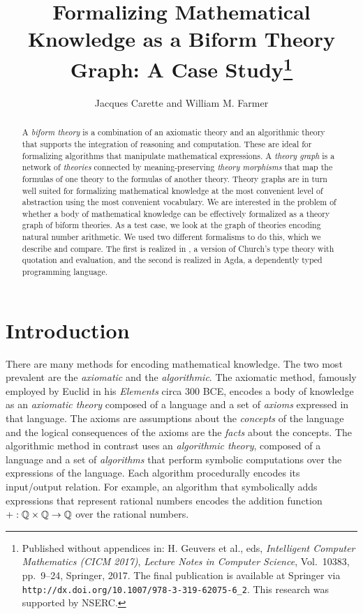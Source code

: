 \documentclass[fleqn]{llncs}
\title{Formalizing Mathematical Knowledge as a Biform Theory Graph: A
  Case Study\thanks{Published without appendices in: H. Geuvers et
    al., eds, \emph{Intelligent Computer Mathematics (CICM 2017)},
    \emph{Lecture Notes in Computer Science}, Vol.~10383, pp.~9--24,
    Springer, 2017. The final publication is available at Springer via
    \texttt{http://dx.doi.org/10.1007/978-3-319-62075-6\_2}.  This
    research was supported by NSERC.}}
\author{Jacques Carette and William M. Farmer}
\institute{%
Computing and Software, McMaster University, Canada\\
\url{http://www.cas.mcmaster.ca/~carette}\\
\url{http://imps.mcmaster.ca/wmfarmer}\\[1.5ex]
\iftoggle{cicm}{}{\today}
}
\begin{document}
\maketitle

\begin{abstract}
A \emph{biform theory} is a combination of an axiomatic theory and an
algorithmic theory that supports the integration of reasoning and
computation.  These are ideal for formalizing algorithms that
manipulate mathematical expressions.  A \emph{theory graph} is a
network of \emph{theories} connected by meaning-preserving
\emph{theory morphisms} that map the formulas of one theory to the
formulas of another theory.  Theory graphs are in turn well suited for
formalizing mathematical knowledge at the most convenient level of
abstraction using the most convenient vocabulary.  We are interested
in the problem of whether a body of mathematical knowledge can be
effectively formalized as a theory graph of biform theories.  As a
test case, we look at the graph of theories encoding natural number
arithmetic.  We used two different formalisms to do this, which we
describe and compare.  The first is realized in {\churchuqe}, a
version of Church's type theory with quotation and evaluation, and the
second is realized in Agda, a dependently typed programming language.
\end{abstract}

\iffalse 

\textbf{Keywords:} Axiomatic mathematics, algorithmic mathematics,
biform theories, theory graphs, symbolic computation, reasoning about
syntax.

\fi

\section{Introduction}\label{sec:introduction}

There are many methods for encoding mathematical knowledge.  The two
most prevalent are the \emph{axiomatic} and the \emph{algorithmic}.
The axiomatic method, famously employed by Euclid in his
\emph{Elements} circa 300 BCE, encodes a body of knowledge as an
\emph{axiomatic theory} composed of a language and a set of
\emph{axioms} expressed in that language.  The axioms are assumptions
about the \emph{concepts} of the language and the logical consequences
of the axioms are the \emph{facts} about the concepts.  The
algorithmic method in contrast uses an \emph{algorithmic theory},
composed of a language and a set of \emph{algorithms} that perform
symbolic computations over the expressions of the language.  Each
algorithm procedurally encodes its input/output relation.  For
example, an algorithm that symbolically adds expressions that
represent rational numbers encodes the addition function $+ :
\mathbb{Q} \times \mathbb{Q} \rightarrow \mathbb{Q}$ over the rational
numbers.
\end{document}
